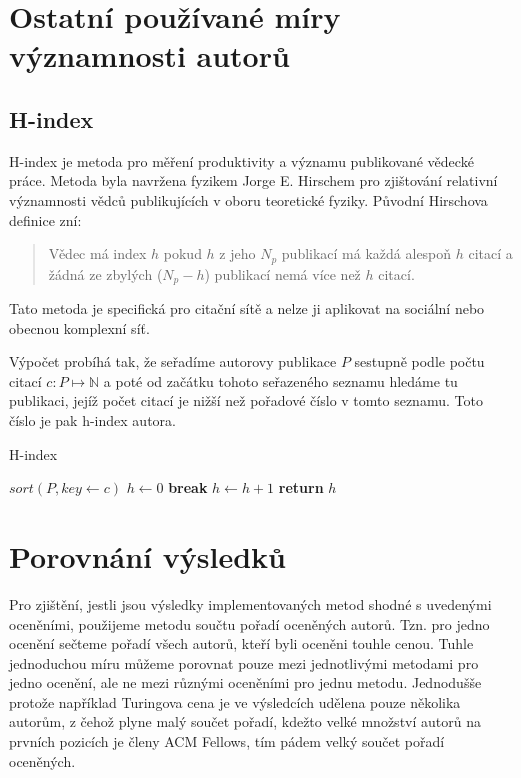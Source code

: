 \documentclass[12pt,titlepage]{report}
\begin{document}
\section{Ostatní používané míry významnosti autorů}
\subsection{H-index}
H-index je metoda pro měření produktivity a významu publikované vědecké práce.
Metoda byla navržena fyzikem Jorge E. Hirschem pro zjištování relativní
významnosti vědců publikujících v oboru teoretické fyziky. Původní Hirschova
definice zní:

\begin{quotation}
Vědec má index $h$ pokud $h$ z jeho $N_p$ publikací má každá alespoň $h$ citací
a žádná ze zbylých ($N_p - h$) publikací nemá více než $h$ citací.
\end{quotation}

Tato metoda je specifická pro citační sítě a nelze ji aplikovat na sociální
nebo obecnou komplexní síť.

Výpočet probíhá tak, že seřadíme autorovy publikace $P$ sestupně podle počtu
citací $c: P \mapsto \mathbb{N}$ a poté od začátku tohoto seřazeného seznamu
hledáme tu publikaci, jejíž počet citací je nižší než pořadové číslo v tomto
seznamu. Toto číslo je pak h-index autora.
\begin{center}
\begin{minipage}{\textwidth}
\begin{algorithm}[H]
	\caption{H-index}
		\label{alg:hindex}

	\begin{algorithmic}[1]
	\Statex
		\State $sort(P, key \gets c)$
		\State $h \gets 0$
				\State \textbf{break}
			\EndIf
			\State $h \gets h + 1$
		\EndFor
		\State \textbf{return} $h$
	\EndFunction
	\end{algorithmic}
\end{algorithm}
\end{minipage}
\end{center}
\mbox{}


\section{Porovnání výsledků}
Pro zjištění, jestli jsou výsledky implementovaných metod shodné s uvedenými
oceněními, použijeme metodu součtu pořadí oceněných autorů. Tzn. pro jedno
ocenění sečteme pořadí všech autorů, kteří byli oceněni touhle cenou. Tuhle
jednoduchou míru můžeme porovnat pouze mezi jednotlivými metodami pro jedno
ocenění, ale ne mezi různými oceněními pro jednu metodu. Jednodušše protože
například Turingova cena je ve výsledcích udělena pouze několika autorům, z
čehož plyne malý součet pořadí, kdežto velké množství autorů na prvních
pozicích je členy ACM Fellows, tím pádem velký součet pořadí oceněných.
\end{document}
